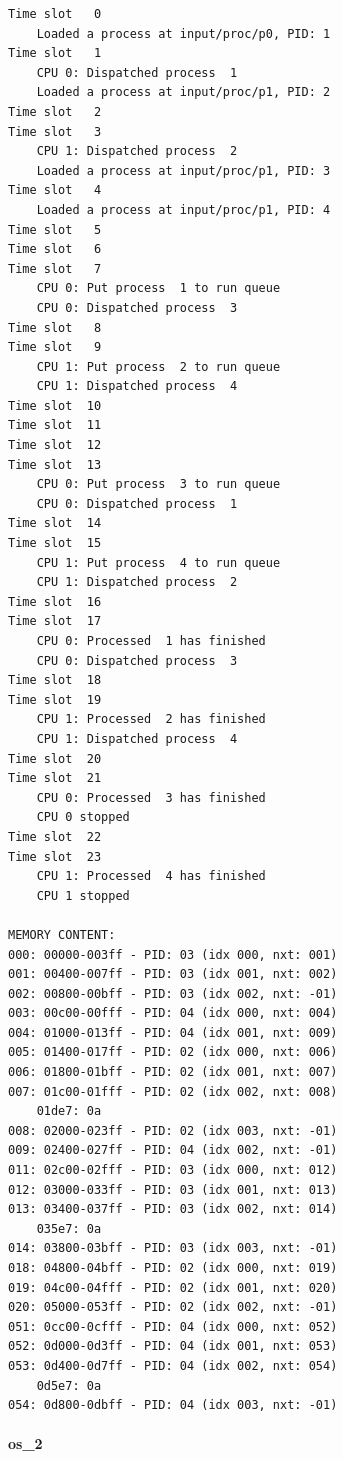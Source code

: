 \documentclass[]{article}
\let\oldparagraph\paragraph
\renewcommand{\paragraph}[1]{\oldparagraph{#1}\mbox{}}
\begin{document}
\begin{verbatim}
Time slot   0
	Loaded a process at input/proc/p0, PID: 1
Time slot   1
	CPU 0: Dispatched process  1
	Loaded a process at input/proc/p1, PID: 2
Time slot   2
Time slot   3
	CPU 1: Dispatched process  2
	Loaded a process at input/proc/p1, PID: 3
Time slot   4
	Loaded a process at input/proc/p1, PID: 4
Time slot   5
Time slot   6
Time slot   7
	CPU 0: Put process  1 to run queue
	CPU 0: Dispatched process  3
Time slot   8
Time slot   9
	CPU 1: Put process  2 to run queue
	CPU 1: Dispatched process  4
Time slot  10
Time slot  11
Time slot  12
Time slot  13
	CPU 0: Put process  3 to run queue
	CPU 0: Dispatched process  1
Time slot  14
Time slot  15
	CPU 1: Put process  4 to run queue
	CPU 1: Dispatched process  2
Time slot  16
Time slot  17
	CPU 0: Processed  1 has finished
	CPU 0: Dispatched process  3
Time slot  18
Time slot  19
	CPU 1: Processed  2 has finished
	CPU 1: Dispatched process  4
Time slot  20
Time slot  21
	CPU 0: Processed  3 has finished
	CPU 0 stopped
Time slot  22
Time slot  23
	CPU 1: Processed  4 has finished
	CPU 1 stopped

MEMORY CONTENT: 
000: 00000-003ff - PID: 03 (idx 000, nxt: 001)
001: 00400-007ff - PID: 03 (idx 001, nxt: 002)
002: 00800-00bff - PID: 03 (idx 002, nxt: -01)
003: 00c00-00fff - PID: 04 (idx 000, nxt: 004)
004: 01000-013ff - PID: 04 (idx 001, nxt: 009)
005: 01400-017ff - PID: 02 (idx 000, nxt: 006)
006: 01800-01bff - PID: 02 (idx 001, nxt: 007)
007: 01c00-01fff - PID: 02 (idx 002, nxt: 008)
	01de7: 0a
008: 02000-023ff - PID: 02 (idx 003, nxt: -01)
009: 02400-027ff - PID: 04 (idx 002, nxt: -01)
011: 02c00-02fff - PID: 03 (idx 000, nxt: 012)
012: 03000-033ff - PID: 03 (idx 001, nxt: 013)
013: 03400-037ff - PID: 03 (idx 002, nxt: 014)
	035e7: 0a
014: 03800-03bff - PID: 03 (idx 003, nxt: -01)
018: 04800-04bff - PID: 02 (idx 000, nxt: 019)
019: 04c00-04fff - PID: 02 (idx 001, nxt: 020)
020: 05000-053ff - PID: 02 (idx 002, nxt: -01)
051: 0cc00-0cfff - PID: 04 (idx 000, nxt: 052)
052: 0d000-0d3ff - PID: 04 (idx 001, nxt: 053)
053: 0d400-0d7ff - PID: 04 (idx 002, nxt: 054)
	0d5e7: 0a
054: 0d800-0dbff - PID: 04 (idx 003, nxt: -01)
\end{verbatim}


\paragraph{os\_2}\label{os2}
\end{document}
